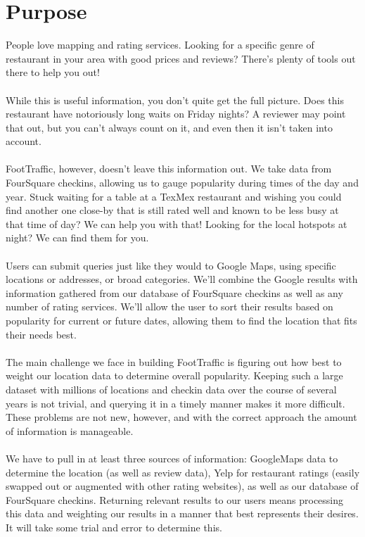 \documentclass{article}
\begin{document}
\section{Purpose}
People love mapping and rating services. Looking for a specific genre of restaurant in your area with
good prices and reviews? There's plenty of tools out there to help you out!
\\ \\
While this is useful information, you don't quite get the full picture. Does this restaurant have notoriously
long waits on Friday nights? A reviewer may point that out, but you can't always count on it, and even
then it isn't taken into account.
\\ \\
FootTraffic, however, doesn't leave this information out. We take data from FourSquare checkins, allowing
us to gauge popularity during times of the day and year. Stuck waiting for a table at a TexMex restaurant
and wishing you could find another one close-by that is still rated well and known to be less busy at
that time of day? We can help you with that! Looking for the local hotspots at night? We can find them for you.  
\\ \\
Users can submit queries just like they would to Google Maps, using specific locations or addresses,
or broad categories. We'll combine the Google results with information gathered from our database of
FourSquare checkins as well as any number of rating services. We'll allow the user to sort their results
based on popularity for current or future dates, allowing them to find the location that fits their needs best.
\\ \\
The main challenge we face in building FootTraffic is figuring out how best to weight our location data
to determine overall popularity. Keeping such a large dataset with millions of locations and checkin
data over the course of several years is not trivial, and querying it in a timely manner makes it more difficult.
These problems are not new, however, and with the correct approach the amount of information is manageable.
\\ \\
We have to pull in at least three sources of information: GoogleMaps data to determine the location (as
well as review data), Yelp for restaurant ratings (easily swapped out or augmented with other rating
websites), as well as our database of FourSquare checkins. Returning relevant results to our users means
processing this data and weighting our results in a manner that best represents their desires. It will
take some trial and error to determine this.
\end{document}
